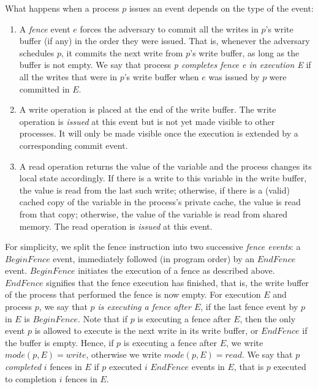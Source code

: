 What happens when a process $p$ issues an event depends on the type of the event:
\begin{enumerate}
	\item A \emph{fence} event $e$ forces the adversary to commit all the writes in $p$'s write buffer (if any) in the order they were issued. That is, whenever the adversary schedules $p$, it commits the next write from $p$'s write buffer, as long as the buffer is not empty. We say that process \emph{p completes fence e in execution E} if all the writes that were in $p$'s write buffer when $e$ was issued by $p$ were committed in $E$.
	\item A write operation is placed at the end of the write buffer. The write operation is \emph{issued} at this event but is not yet made visible to other processes. It will only be made visible once the execution is extended by a corresponding commit event.
	\item A read operation returns the value of the variable and the process changes its local state accordingly. If there is a write to this variable in the write buffer, the value is read from the last such write; otherwise, if there is a (valid) cached copy of the variable in the process's private cache, the value is read from that copy; otherwise, the value of the variable is read from shared memory. The read operation is \emph{issued} at this event.
\end{enumerate}

For simplicity, we split the fence instruction into two successive \emph{fence events}: a $BeginFence$ event, immediately followed (in program order) by an $EndFence$ event. $BeginFence$ initiates the execution of a fence as described above. $EndFence$ signifies that the fence execution has finished, that is, the write buffer of the process that performed the fence is now empty. For execution $E$ and process $p$, we say that \emph{$p$ is
executing a fence after $E$}, if the last fence event by $p$ in $E$ is $BeginFence$. Note that if $p$ is executing a fence after $E$, then the only event $p$ is allowed to execute is the next write in its write buffer, or $EndFence$ if the buffer is empty. Hence, if $p$ is executing a fence after $E$, we write $mode(p,E) = write$, otherwise we write $mode(p,E) = read$. We say that $p$ \emph{completed} $i$ fences in $E$ if $p$ executed $i$ $EndFence$ events in $E$, that is $p$ executed to completion $i$ fences in $E$.




